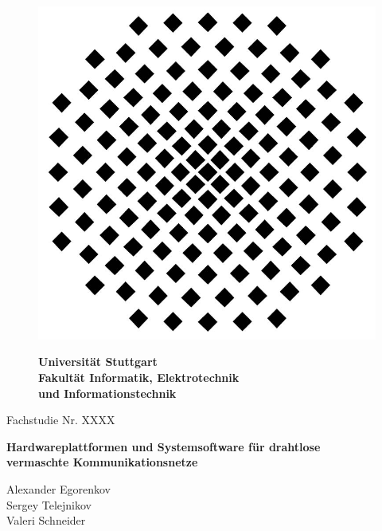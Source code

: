 \begin{titlepage}

\begin{figure}[h]
\centering
\hfill
\begin{minipage}{0.2\textwidth}
\includegraphics[width=1.0\textwidth]{images/uni_logo.jpg}
\end{minipage}
\begin{minipage}{0.7\textwidth}
{\Huge\bf Universit\"at Stuttgart}\\[12pt]
{\Large\bf Fakult\"at Informatik, Elektrotechnik\\und Informationstechnik}
\end{minipage}
\end{figure}

\vspace{50pt}

\begin{center}
Fachstudie Nr. XXXX
\end{center}

\begin{center}
\Large\bf
Hardwareplattformen und Systemsoftware f\"ur drahtlose\\
vermaschte Kommunikationsnetze
\end{center}

\begin{center}
Alexander Egorenkov\\
Sergey Telejnikov\\
Valeri Schneider
\end{center}


\end{titlepage}

